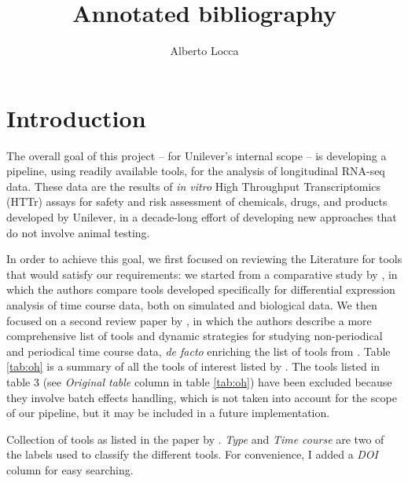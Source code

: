 \documentclass[10pt,a4paper]{article}
\title{Annotated bibliography}
\author{Alberto Locca}
\begin{document}
\maketitle

\section{Introduction}
The overall goal of this project -- for Unilever's internal scope -- is developing a pipeline, using readily available tools, for the analysis of longitudinal RNA-seq data. These data are the results of \textit{in vitro} High Throughput Transcriptomics (HTTr) assays for safety and risk assessment of chemicals, drugs, and products developed by Unilever, in a decade-long effort of developing new approaches that do not involve animal testing.

In order to achieve this goal, we first focused on reviewing the Literature for tools that would satisfy our requirements: we started from a comparative study by \citet{spiesComparativeAnalysisDifferential2019}, in which the authors compare tools developed specifically for differential expression analysis of time course data, both on simulated and biological data. 
We then focused on a second review paper by \citet{ohTemporalDynamicMethods2021}, in which the authors describe a more comprehensive list of tools and dynamic strategies for studying non-periodical and periodical time course data, \textit{de facto} enriching the list of tools from \citeauthor{spiesComparativeAnalysisDifferential2019}. Table \ref{tab:oh} is a summary of all the tools of interest listed by \citeauthor{ohTemporalDynamicMethods2021}. The tools listed in table 3 (see \emph{Original table} column in table \ref{tab:oh}) have been excluded because they involve batch effects handling, which is not taken into account for the scope of our pipeline, but it may be included in a future implementation.

\begin{table}[!ht]
\centering\footnotesize

\caption{Collection of tools as listed in the paper by \citet{ohTemporalDynamicMethods2021}. \emph{Type} and \emph{Time course} are two of the labels used to classify the different tools. For convenience, I added a \emph{DOI} column for easy searching.}
\label{tab:oh}
\end{table}
\end{document}
